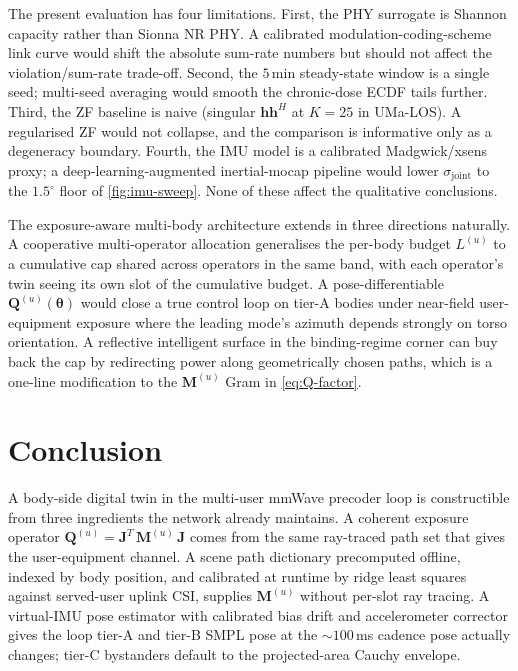 \documentclass[journal,twocolumn,10pt]{IEEEtran}
\theoremstyle{plain}
\theoremstyle{remark}
\newcommand{\hh}{\mathbf{h}}
\newcommand{\Qmat}{\mathbf{Q}}
\newcommand{\Mmat}{\mathbf{M}}
\newcommand{\Jmat}{\mathbf{J}}
\begin{document}
The present evaluation has four limitations. First, the PHY surrogate
is Shannon capacity rather than Sionna NR PHY. A calibrated
modulation-coding-scheme link curve would shift the absolute
sum-rate numbers but should not affect the violation/sum-rate
trade-off. Second, the $5\,$min steady-state window is a single seed;
multi-seed averaging would smooth the chronic-dose ECDF tails further.
Third, the ZF baseline is naive (singular $\hh \hh^H$ at $K = 25$ in
UMa-LOS). A regularised ZF would not collapse, and the comparison is
informative only as a degeneracy boundary. Fourth, the IMU model is
a calibrated Madgwick/xsens proxy; a deep-learning-augmented
inertial-mocap pipeline would lower $\sigma_{\mathrm{joint}}$ to the
$1.5^\circ$ floor of \cref{fig:imu-sweep}. None of these affect the
qualitative conclusions.

The exposure-aware multi-body architecture extends in three
directions naturally. A cooperative multi-operator allocation
generalises the per-body budget $L^{(u)}$ to a cumulative cap shared
across operators in the same band, with each operator's twin seeing
its own slot of the cumulative budget. A pose-differentiable
$\Qmat^{(u)}(\bm\theta)$ would close a true control loop on tier-A
bodies under near-field user-equipment exposure where the leading
mode's azimuth depends strongly on torso orientation. A reflective
intelligent surface in the binding-regime corner can buy back the
cap by redirecting power along geometrically chosen paths, which is
a one-line modification to the $\Mmat^{(u)}$ Gram in
\cref{eq:Q-factor}.


\section{Conclusion}\label{sec:conclusion}

A body-side digital twin in the multi-user mmWave precoder loop is
constructible from three ingredients the network already maintains.
A coherent exposure operator
$\Qmat^{(u)} = \Jmat^T\,\Mmat^{(u)}\,\Jmat$ comes from the same
ray-traced path set that gives the user-equipment channel. A scene
path dictionary precomputed offline, indexed by body position, and
calibrated at runtime by ridge least squares against served-user
uplink CSI, supplies $\Mmat^{(u)}$ without per-slot ray tracing. A
virtual-IMU pose estimator with calibrated bias drift and
accelerometer corrector gives the loop tier-A and tier-B SMPL pose
at the $\sim 100\,$ms cadence pose actually changes; tier-C
bystanders default to the projected-area Cauchy envelope.
\end{document}
